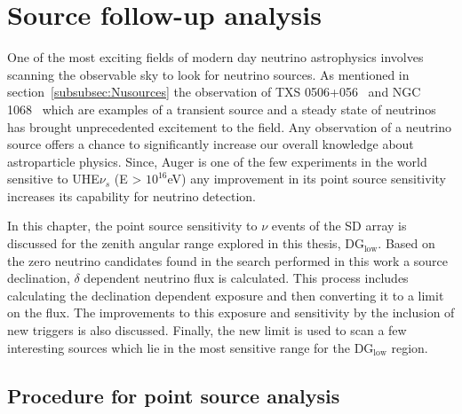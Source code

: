 
\chapter{Source follow-up analysis}
\label{chap:follow-up}

One of the most exciting fields of modern day neutrino astrophysics involves scanning the observable sky to look for neutrino sources. As mentioned in section~\ref{subsubsec:Nusources} the observation of TXS 0506+056~\cite{Icecube_txs} and NGC 1068~\cite{Icecube_2022} which are examples of a transient source and a steady state of neutrinos has brought unprecedented excitement to the field. Any observation of a neutrino source offers a chance to significantly increase our overall knowledge about astroparticle physics. Since, Auger is one of the few experiments in the world sensitive to UHE$\nu_s$ (E > $10^{16}$eV) any improvement in its point source sensitivity increases its capability for neutrino detection. 

In this chapter, the point source sensitivity to $\nu$ events of the SD array is discussed for the zenith angular range explored in this thesis, DG$_{\text{low}}$. Based on the zero neutrino candidates found in the search performed in this work a source declination, $\delta$ dependent neutrino flux is calculated. This process includes calculating the declination dependent exposure and then converting it to a limit on the flux. The improvements to this exposure and sensitivity by the inclusion of new triggers is also discussed. Finally, the new limit is used to scan a few interesting sources which lie in the most sensitive range for the DG$_{\text{low}}$ region.

\section{Procedure for point source analysis}
\label{sec:procedure_point_source}


